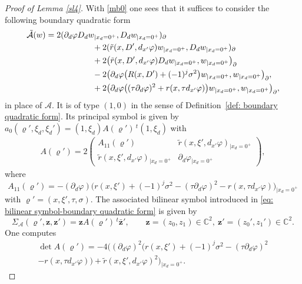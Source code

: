 \documentclass[10pt]{amsart}
\theoremstyle{plain}
\theoremstyle{definition}
\def\C{\mathbb{C}}
\let\y\varrho
\newcommand{\inp}[2]{(#1, #2)}
\newcommand{\biginp}[2]{\big(#1, #2 \big)}
\newcommand{\un}[1]{\Sigma_{#1}}
\newcommand{\z}{\boldsymbol{z}}
\newcommand{\br}{\ensuremath{_{|x_d=0^+}}}
\newcommand{\transp}{\ensuremath{\phantom{}^{t}}}
\begin{document}
\begin{proof}[ Proof of Lemma \ref{sl4}]
With \eqref{mb0} one sees that it suffices to consider the following boundary
quadratic form
\[
\begin{split}
\tilde{\mathcal{A}}(w)
&=2 \inp{\partial_d\varphi D_d w\br}{D_dw\br}_\partial \\
&\hspace*{2cm} + 2 \inp{\tilde{r} (x,D', d_{x'}\varphi) w\br}{D_dw\br}_\partial \\
& \hspace*{2cm} + 2 \biginp{ \tilde{r} (x,D', d_{x'} \varphi) D_d
w\br}{w\br}_\partial \\
&\hspace*{2cm} - 2 \biginp{ \partial_d\varphi
\big(R(x,D') +(-1)^j \sigma^2\big)
w\br}{w\br}_\partial,
\\
&\hspace*{2cm} + 2 \biginp{ \partial_d\varphi
\big((\tau\partial_d\varphi)^2+r(x,\tau d_{x'}\varphi)\big)
w\br}{w\br}_\partial,
\end{split}
\]
in place of $\mathcal A$. It is of type $(1,0)$ in the sense of Definition~\ref{def: boundary quadratic form}.
Its principal symbol is given by $a_0(\y',\xi_d, \xi_d') = (1, \xi_d) A(\y')\, \transp(1, \xi_d)$ with
\begin{align*}
A (\y') = 2 \begin{pmatrix}
A_{11} (\y')
& \tilde{r}(x,\xi',d_{x'}\varphi)\br
\\
\tilde{r}(x,\xi',d_{x'}\varphi) \br
& \partial_d\varphi\br
\end{pmatrix},
\end{align*}
where
\begin{equation*}
A_{11} (\y') =- (\partial_d\varphi)\big(r(x,\xi') + (-1)^j\sigma^2-(\tau\partial_d\varphi)^2-r(x,\tau
d_{x'}\varphi)\big)\br
\end{equation*}
with $\y' = (x,\xi',\tau,\sigma)$. The associated bilinear symbol
introduced in \eqref{eq: bilinear
symbol-boundary quadratic form}
is given by
\begin{equation*}
\un{\mathcal A}(\y',\z,\z') = \z A (\y') \, \transp \bar{\z}',\qquad \z=(z_0,
z_1) \in \C^2, \ \z' =(z_0',z_1') \in \C^2.
\end{equation*}
One computes
\begin{multline*}
\det A(\y') = - 4
\Big((\partial_d\varphi)^2 \big(r(x,\xi') +
(-1)^j\sigma^2-(\tau\partial_d\varphi)^2\\[-5pt]
-r(x,\tau d_{x'}\varphi)\big)+ \tilde{r}(x,\xi',d_{x'}\varphi) ^2\Big) \br.

\end{multline*}
\end{proof}
\end{document}
